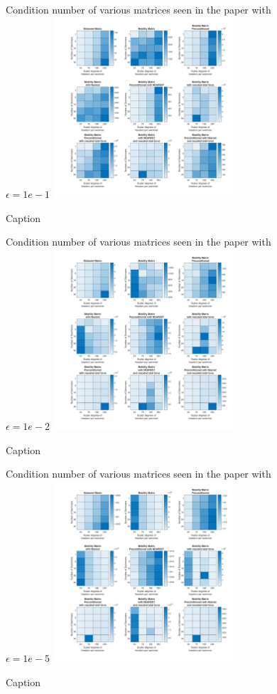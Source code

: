  \begin{figure}
     \centering
     Condition number of various matrices seen in the paper with $\epsilon=1e-1$
     \includegraphics[width=0.6\textwidth]{Images/Condition/Condition-1.pdf}
     \caption{Caption}
     \label{fig:Condition1}
 \end{figure}
 \begin{figure}
 \ContinuedFloat
     \centering
     Condition number of various matrices seen in the paper with $\epsilon=1e-2$
     \includegraphics[width=0.6\textwidth]{Images/Condition/Condition-2.pdf}
     \caption{Caption}
     \label{fig:Condition2}
\end{figure}
\begin{figure}
\ContinuedFloat
     \centering
     Condition number of various matrices seen in the paper with $\epsilon=1e-5$
     \includegraphics[width=0.6\textwidth]{Images/Condition/Condition-5.pdf}
     \caption{Caption}
     \label{fig:Condition5}
\end{figure}

